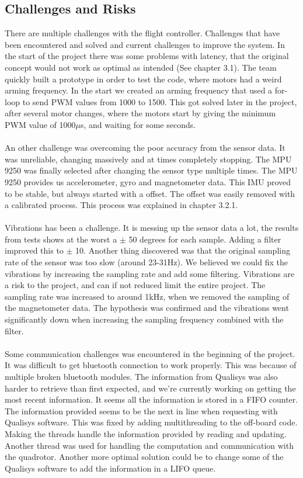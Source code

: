 \subsection{Challenges and Risks}
There are multiple challenges with the flight controller. Challenges that have been encountered and solved and current challenges to improve the system.
In the start of the project there was some problems with latency, that the original concept would not work as optimal as intended (See chapter 3.1). The team quickly built a prototype in order to test the code, where motors had a weird arming frequency. In the start we created an arming frequency that used a for-loop to send PWM values from 1000 to 1500. This got solved later in the project, after several motor changes, where the motors start by giving the minimum PWM value of 1000$\mu$s, and waiting for some seconds. 
\\\\
An other challenge was overcoming the poor accuracy from the sensor data. It was unreliable, changing massively and at times completely stopping. The MPU 9250 was finally selected after changing the sensor type multiple times. The MPU 9250 provides us accelerometer, gyro and magnetometer data. This IMU proved to be stable, but always started with a offset. The offset was easily removed with a calibrated process. This process was explained in chapter 3.2.1.
\\\\
Vibrations has been a challenge. It is messing up the sensor data a lot, the results from tests shows at the worst a $\pm$ 50 degrees for each sample. Adding a filter improved this to $\pm$ 10. Another thing discovered was that the original sampling rate of the sensor was too slow (around 23-31Hz). We believed we could fix the vibrations by increasing the sampling rate and add some filtering. Vibrations are a risk to the project, and can if not reduced limit the entire project. The sampling rate was increased to around 1kHz, when we removed the sampling of the magnetometer data. The hypothesis was confirmed and the vibrations went significantly down when increasing the sampling frequency combined with the filter. 
\\\\
Some communication challenges was encountered in the beginning of the project. It was difficult to get bluetooth connection to work properly. This was because of multiple broken bluetooth modules. The information from Qualisys was also harder to retrieve than first expected, and we're currently working on getting the most recent information. It seems all the information is stored in a FIFO counter. The information provided seems to be the next in line when requesting with Qualisys software. This was fixed by adding multithreading to the off-board code. Making the threads handle the information provided by reading and updating. Another thread was used for handling the computation and communication with the quadrotor. Another more optimal solution could be to change some of the Qualisys software to add the information in a LIFO queue.

